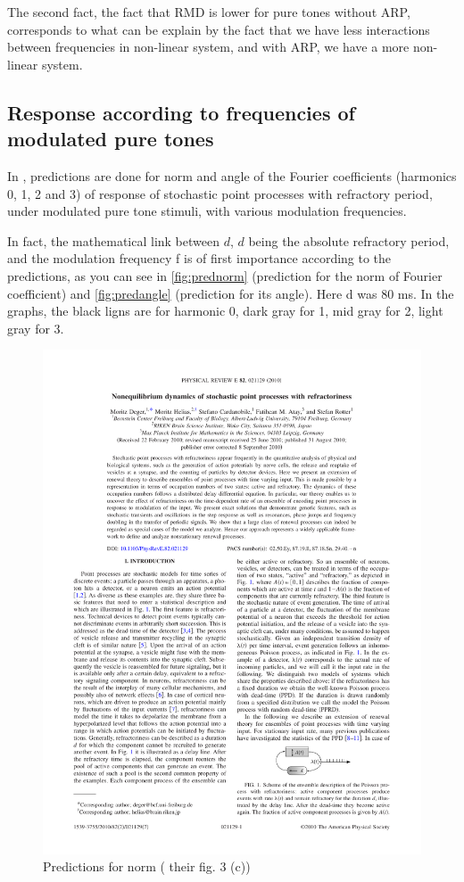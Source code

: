 The second fact, the fact that RMD is lower for pure tones without ARP, 
corresponds to what can be explain by the fact that we have less 
interactions between frequencies in non-linear system,
and with ARP, we have a more non-linear system.

\subsection{Response according to frequencies of modulated pure tones}

In \cite{Deger}, predictions are done for norm and angle of the Fourier coefficients 
(harmonics 0, 1, 2 and 3) of response of stochastic point processes with refractory period,
under modulated pure tone stimuli, with various modulation frequencies.

In fact, the mathematical link between $d$, $d$ being the absolute refractory period,
and the modulation frequency f is of first importance according to the predictions,
 as you can see in \autoref{fig:prednorm} (prediction for the norm of Fourier coefficient) and 
\autoref{fig:predangle} (prediction for its angle). Here d was 80 ms. 
In the graphs, the black ligns are for harmonic 0, dark gray for 1, mid gray for 2, light gray for 3.


\begin{figure}[h]
	\centering
	\includegraphics*[page=4,viewport=308 567 441 617]{images/Deger2010.pdf} %
	\caption{Predictions for norm (\cite{Deger}  their fig. 3 (c))}
	\label{fig:prednorm}
\end{figure}

